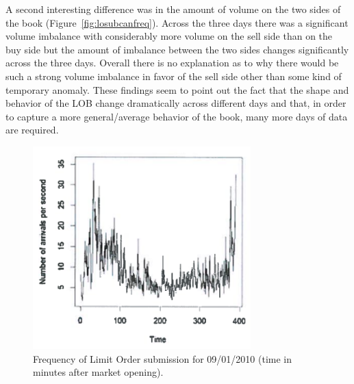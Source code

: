 A second interesting difference was in the amount of volume on the two sides of the book (Figure~\ref{fig:losubcanfreq}). Across the three days there was a significant volume imbalance with considerably more volume on the sell side than on the buy side but the amount of imbalance between the two sides changes significantly across the three days. Overall there is no explanation as to why there would be such a strong volume imbalance in favor of the sell side other than some kind of temporary anomaly. These findings seem to point out the fact that the shape and behavior of the LOB change dramatically across different days and that, in order to capture a more general/average behavior of the book, many more days of data are required. \twomedskip
	\begin{figure}[!ht]
   	\centering
   	\includegraphics[width=0.75\textwidth]{chapters/chapter_trade_data_models/figures/freqsubmit.png} 
   	\caption{Frequency of Limit Order submission for 09/01/2010 (time in minutes after market opening). \label{fig:freqsubmit1}}
	\end{figure}
